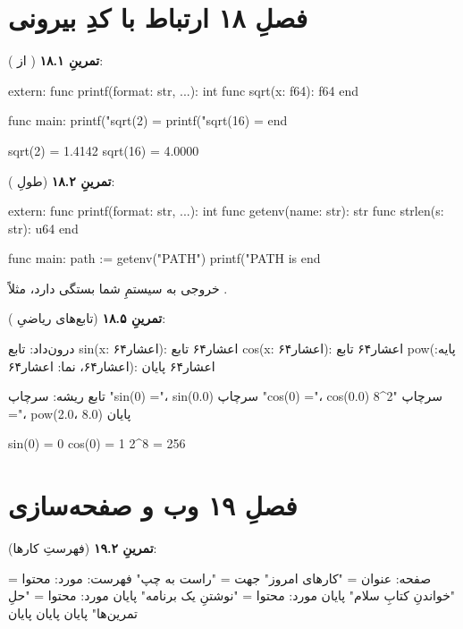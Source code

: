 \section*{فصلِ ۱۸ ارتباط با کدِ بیرونی}
{}

\textbf{تمرینِ ۱۸.۱} ( از ):
\begin{salamen}
extern:
    func printf(format: str, ...): int
    func sqrt(x: f64): f64
end

func main:
    printf("sqrt(2)  = %
    printf("sqrt(16) = %
end
\end{salamen}

\begin{progout}
sqrt(2)  = 1.4142
sqrt(16) = 4.0000
\end{progout}

\textbf{تمرینِ ۱۸.۲} (طولِ ):
\begin{salamen}
extern:
    func printf(format: str, ...): int
    func getenv(name: str): str
    func strlen(s: str): u64
end

func main:
    path := getenv("PATH")
    printf("PATH is %
end
\end{salamen}

خروجی به سیستمِ شما بستگی دارد، مثلاً .

\textbf{تمرینِ ۱۸.۵} (تابع‌های ریاضیِ ):
\begin{salamfa}
درون‌داد:
    تابع sin(x: اعشار۶۴): اعشار۶۴
    تابع cos(x: اعشار۶۴): اعشار۶۴
    تابع pow(پایه: اعشار۶۴، نما: اعشار۶۴): اعشار۶۴
پایان

تابع ریشه:
    سرچاپ "sin(0) ="، sin(0.0)
    سرچاپ "cos(0) ="، cos(0.0)
    سرچاپ "2^8 ="، pow(2.0، 8.0)
پایان
\end{salamfa}

\begin{progoutfa}
sin(0) = 0
cos(0) = 1
2^8 = 256
\end{progoutfa}

\section*{فصلِ ۱۹ وب و صفحه‌سازی}
{}

\textbf{تمرینِ ۱۹.۲} (فهرستِ کارها):
\begin{salamfa}
صفحه:
    عنوان = "کارهای امروز"
    جهت = "راست به چپ"
    فهرست:
        مورد: محتوا = "خواندنِ کتابِ سلام" پایان
        مورد: محتوا = "نوشتنِ یک برنامه" پایان
        مورد: محتوا = "حلِ تمرین‌ها" پایان
    پایان
پایان
\end{salamfa}

